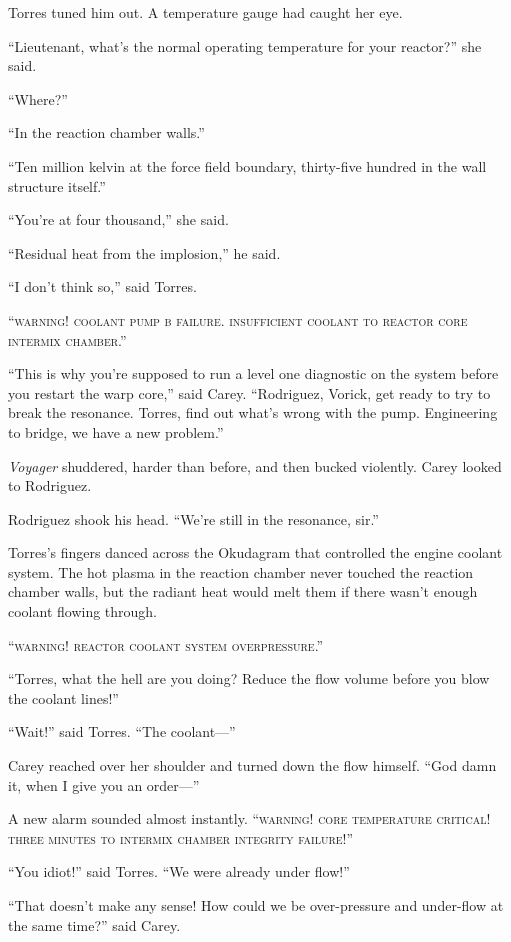 \documentclass[twoside,letterpaper,12pt]{memoir}
\begin{document}
Torres tuned him out. A temperature gauge had caught her eye.

``Lieutenant, what's the normal operating temperature for your reactor?'' she said.

``Where?''

``In the reaction chamber walls.''

``Ten million kelvin at the force field boundary, thirty-five hundred in the wall structure itself.''

``You're at four thousand,'' she said.

``Residual heat from the implosion,'' he said.

``I don't think so,'' said Torres.

``\textsc{warning! coolant pump b failure. insufficient coolant to reactor core intermix chamber}.''

``This is why you're supposed to run a level one diagnostic on the system before you restart the warp core,'' said Carey. ``Rodriguez, Vorick, get ready to try to break the resonance. Torres, find out what's wrong with the pump. Engineering to bridge, we have a new problem.''

\textit{Voyager} shuddered, harder than before, and then bucked violently. Carey looked to Rodriguez.

Rodriguez shook his head. ``We're still in the resonance, sir.''

Torres's fingers danced across the Okudagram that controlled the engine coolant system. The hot plasma in the reaction chamber never touched the reaction chamber walls, but the radiant heat would melt them if there wasn't enough coolant flowing through.

``\textsc{warning! reactor coolant system overpressure}.''

``Torres, what the hell are you doing? Reduce the flow volume before you blow the coolant lines!''

``Wait!'' said Torres. ``The coolant---''

Carey reached over her shoulder and turned down the flow himself. ``God damn it, when I give you an order---''

A new alarm sounded almost instantly. ``\textsc{warning! core temperature critical! three minutes to intermix chamber integrity failure!}''

``You idiot!'' said Torres. ``We were already under flow!''

``That doesn't make any sense! How could we be over-pressure and under-flow at the same time?'' said Carey.
\end{document}
